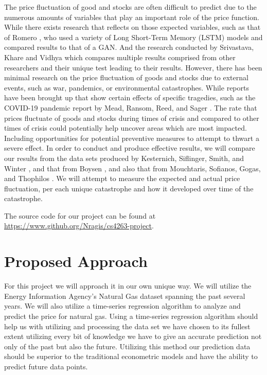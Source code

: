 \documentclass[final]{cvpr}
\begin{document}
The price fluctuation of good and stocks are often difficult to predict due to
the numerous amounts of variables that play an important role of the price
function.  While there exists research that reflects on those expected
variables, such as that of Romero \cite{romero}, who used a variety of Long
Short-Term Memory (LSTM) models and compared results to that of a GAN. And the
research conducted by Srivastava, Khare and Vidhya \cite{srivastava} which
compares multiple results comprised from other researchers and their unique test
leading to their results.  However, there has been minimal research on the price
fluctuation of goods and stocks due to external events, such as war, pandemics,
or environmental catastrophes. While reports have been brought up that show
certain effects of specific tragedies, such as the COVID-19 pandemic report by
Mead, Ransom, Reed, and Sager \cite{mead}. The rate that prices fluctuate of
goods and stocks during times of crisis and compared to other times of crisis
could potentially help uncover areas which are most impacted. Including
opportunities for potential preventive measures to attempt to thwart a severe
effect.  In order to conduct and produce effective results, we will compare our
results from the data sets produced by Kesternich, Siflinger, Smith, and Winter
\cite{kesternich}, and that from Boysen \cite{boysen}, and also that from
Mouchtaris, Sofianos, Gogas, and Thophilos \cite{mouchtaris}. We will attempt to
measure the expected and actual price fluctuation, per each unique catastrophe
and how it developed over time of the catastrophe.

The source code for our project can be found at 
\url{https://www.github.org/Nragis/cs4263-project}.


\section{Proposed Approach}

For this project we will approach it in our own unique way. We will utilize the
Energy Information Agency's Natural Gas dataset spanning the past several
years. We will also utilize a time-series regression algorithm to analyze and
predict the price for natural gas. Using a time-series regression algorithm
should help us with utilizing and processing the data set we have chosen to its
fullest extent utilizing every bit of knowledge we have to give an accurate
prediction not only of the past but also the future. Utilizing this method our
prediction data should be superior to the traditional econometric models and
have the ability to predict future data points.
\end{document}
